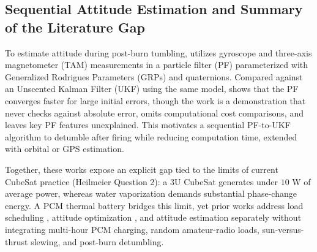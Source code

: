 \subsection{Sequential Attitude Estimation and Summary of the Literature Gap}

To estimate attitude during post-burn tumbling, \cite{xue-yuanjiangSpacecraftAttitudeEstimation2005} utilizes gyroscope and three-axis magnetometer (TAM) measurements in a particle filter (PF) parameterized with Generalized Rodrigues Parameters (GRPs) and quaternions. Compared against an Unscented Kalman Filter (UKF) using the same model, \cite{xue-yuanjiangSpacecraftAttitudeEstimation2005} shows that the PF converges faster for large initial errors, though the work is a demonstration that never checks against absolute error, omits computational cost comparisons, and leaves key PF features unexplained. This motivates a sequential PF-to-UKF algorithm to detumble after firing while reducing computation time, extended with orbital or GPS estimation.

Together, these works expose an explicit gap tied to the limits of current CubeSat practice (Heilmeier Question 2): a 3U CubeSat generates under $10\text{ W}$ of average power, whereas water vaporization demands substantial phase-change energy. A PCM thermal battery bridges this limit, yet prior works address load scheduling \cite{husseinOptimizedLoadSchedulingAlgorithm2023,doff-sottaSpacecraftEnergyManagement2022,akarneSelfAdaptiveEnergyAwarePower2026}, attitude optimization \cite{zhangFinitetimeAttitudeSetpoint2020,kristiansenEnergyOptimalAttitude2024}, and attitude estimation \cite{xue-yuanjiangSpacecraftAttitudeEstimation2005} separately without integrating multi-hour PCM charging, random amateur-radio loads, sun-versus-thrust slewing, and post-burn detumbling.
